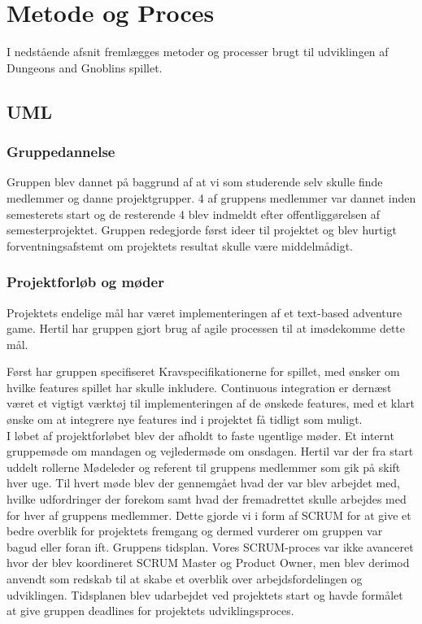 \section{Metode og Proces}
I nedstående afsnit fremlægges metoder og processer brugt 
til udviklingen af Dungeons and Gnoblins spillet. 


\subsection{UML}

\subsubsection{Gruppedannelse}
Gruppen blev dannet på baggrund af at vi som studerende selv skulle finde medlemmer og danne projektgrupper. 4 af gruppens medlemmer var dannet inden semesterets start og de resterende 4 blev indmeldt efter offentliggørelsen af semesterprojektet. Gruppen redegjorde først ideer til projektet og blev hurtigt forventningsafstemt om projektets resultat skulle være middelmådigt. 

\subsubsection{Projektforløb og møder}
Projektets endelige mål har været implementeringen af et text-based adventure game.
Hertil har gruppen gjort brug af agile processen til at imødekomme dette mål.

Først har gruppen specifiseret Kravspecifikationerne for spillet, med ønsker om
hvilke features spillet har skulle inkludere. Continuous integration er dernæst
været et vigtigt værktøj til implementeringen af de ønskede features, med et klart
ønske om at integrere nye features ind i projektet få tidligt som muligt.\\

I løbet af projektforløbet blev der afholdt to faste ugentlige møder. Et internt gruppemøde om mandagen og vejledermøde om onsdagen. Hertil var der fra start uddelt rollerne Mødeleder og referent til gruppens medlemmer som gik på skift hver uge. Til hvert møde blev der gennemgået hvad der var blev arbejdet med, hvilke udfordringer der forekom samt hvad der fremadrettet skulle arbejdes med for hver af gruppens medlemmer. Dette gjorde vi i form af SCRUM for at give et bedre overblik for projektets fremgang og dermed vurderer om gruppen var bagud eller foran ift. Gruppens tidsplan. Vores SCRUM-proces var ikke avanceret hvor der blev koordineret SCRUM Master og Product Owner, men blev derimod anvendt som redskab til at skabe et overblik over arbejdsfordelingen og udviklingen. Tidsplanen blev udarbejdet ved projektets start og havde formålet at give gruppen deadlines for projektets udviklingsproces.

